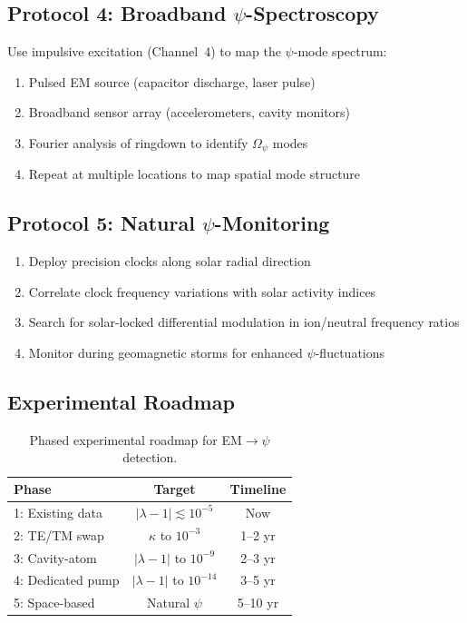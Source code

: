 \documentclass[aps,prd,twocolumn,superscriptaddress,floatfix,nofootinbib]{revtex4-2}
\newcommand{\Opsi}{\Omega_\psi}
\newcommand{\lam}{\lambda}
\begin{document}
\subsection{Protocol 4: Broadband $\psi$-Spectroscopy}

Use impulsive excitation (Channel~4) to map the $\psi$-mode spectrum:
\begin{enumerate}[nosep]
\item Pulsed EM source (capacitor discharge, laser pulse)
\item Broadband sensor array (accelerometers, cavity monitors)
\item Fourier analysis of ringdown to identify $\Opsi$ modes
\item Repeat at multiple locations to map spatial mode structure
\end{enumerate}

\subsection{Protocol 5: Natural $\psi$-Monitoring}

\begin{enumerate}[nosep]
\item Deploy precision clocks along solar radial direction
\item Correlate clock frequency variations with solar activity indices
\item Search for solar-locked differential modulation in ion/neutral
frequency ratios
\item Monitor during geomagnetic storms for enhanced $\psi$-fluctuations
\end{enumerate}

\subsection{Experimental Roadmap}

\begin{table}[h]
\caption{Phased experimental roadmap for EM$\to\psi$ detection.}
\label{tab:roadmap}
\begin{ruledtabular}
\begin{tabular}{lcc}
Phase & Target & Timeline \\
\hline
1: Existing data & $|\lam-1| \lesssim 10^{-5}$ & Now \\
2: TE/TM swap & $\kappa$ to $10^{-3}$ & 1--2 yr \\
3: Cavity-atom & $|\lam-1|$ to $10^{-9}$ & 2--3 yr \\
4: Dedicated pump & $|\lam-1|$ to $10^{-14}$ & 3--5 yr \\
5: Space-based & Natural $\psi$ & 5--10 yr \\
\end{tabular}
\end{ruledtabular}
\end{table}
\end{document}
